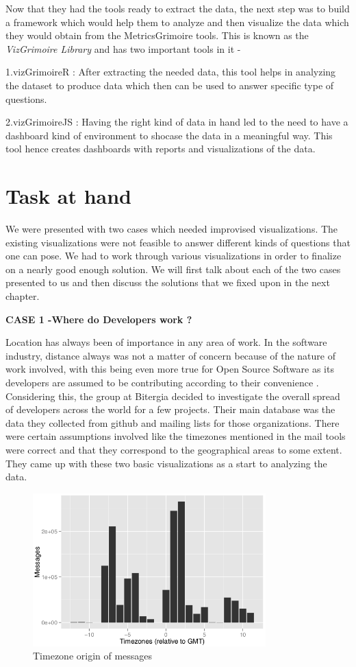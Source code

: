 \documentclass[double,12pt]{beavtex}
\begin{document}
Now that they had the tools ready to extract the data, the next step was to build a framework which would help them to analyze and then visualize the data which they would obtain from the MetricsGrimoire tools. This is known as the \emph{VizGrimoire Library} and has two important tools in it -

1.vizGrimoireR : After extracting the needed data, this tool helps in analyzing the dataset to produce data which then can be used to answer specific type of questions.

2.vizGrimoireJS : Having the right kind of data in hand led to the need to have a dashboard kind of environment to shocase the data in a meaningful way. This tool hence creates dashboards with reports and visualizations of the data.

\section{Task at hand}
We were presented with two cases which needed improvised visualizations. The existing visualizations were not feasible to answer different kinds of questions that one can pose. We had to work through various visualizations in order to finalize on a nearly good enough solution. We will first talk about each of the two cases presented to us and then discuss the solutions that we fixed upon in the next chapter.

 \textbf{CASE 1 -Where do Developers work ?}

Location has always been of importance in any area of work. In the software industry, distance always was not a matter of concern because of the nature of work involved, with this being even more true for Open Source Software as its developers are assumed to be contributing according to their convenience \cite{yuri2010}. Considering this, the group at Bitergia decided to investigate the overall spread of developers across the world for a few projects. Their main database was the data they collected from github and mailing lists for those organizations. There were certain assumptions involved like the timezones mentioned in the mail tools were correct and that they correspond to the geographical areas to some extent. They came up with these two basic visualizations as a start to analyzing the data.

\begin{figure}[!ht]
\centering
\includegraphics[width=90mm]{work1.png}
\caption{Timezone origin of messages}
\end{figure}
\end{document}
